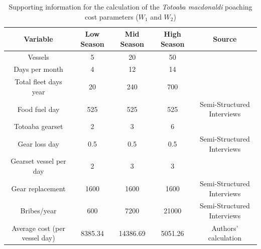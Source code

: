 \begin{landscape}
\begin{table}[H]
\centering
\begin{tabular}[t]{ccccc}
\hline 
Variable & Low Season & Mid Season & High Season & Source\\
\hline \hline
Vessels & 5 & 20 & 50 & \cite{cisneros-mata_evaluacion_2020} \\
Days per month & 4 & 12 & 14 & \cite{cisneros-mata_evaluacion_2020}\\
Total fleet days year & 20 & 240 & 700 & \cite{cisneros-mata_evaluacion_2020}\\
Food fuel day & 525 & 525 & 525 & Semi-Structured Interviews\\
Totoaba gearset & 2 & 3 & 6 & \cite{cisneros-mata_evaluacion_2020}\\
Gear loss day & 0.5 & 0.5 & 0.5 & Semi-Structured Interviews\\
Gearset vessel per day & 2 & 3 & 3 & \cite{cisneros-mata_evaluacion_2020}\\
Gear replacement & 1600 & 1600 & 1600 & Semi-Structured Interviews\\
Bribes/year & 600 & 7200 & 21000 & Semi-Structured Interviews\\
\hline 
Average cost (per vessel day) & 8385.34 & 14386.69 & 5051.26 & Authors' calculation\\
\hline \hline
\end{tabular}
\caption{Supporting information for the calculation of the\textit{ Totoaba macdonaldi} poaching cost parameters ($W_1$ and $W_2$)}
\label{tab:costW}
\end{table}
\end{landscape}
\newpage

